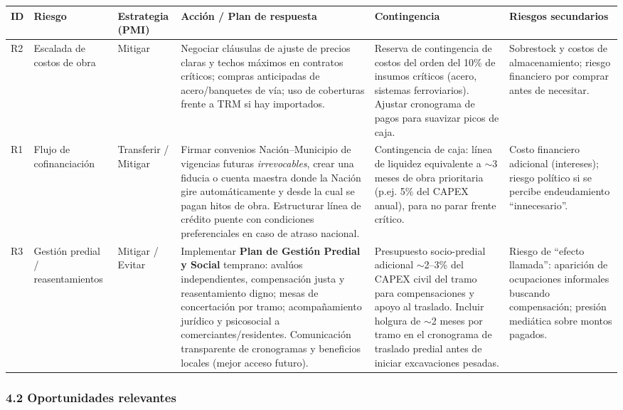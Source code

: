 \begin{table}[H]\centering\small
\begin{tabular}{p{1cm}p{2cm}p{1.5cm}p{3.5cm}p{3cm}p{3.5cm}}
\toprule
\textbf{ID} & \textbf{Riesgo} & \textbf{Estrategia (PMI)} & \textbf{Acción / Plan de respuesta} & \textbf{Contingencia} & \textbf{Riesgos secundarios} \\
\midrule
R2 & Escalada de costos de obra & Mitigar & 
Negociar cláusulas de ajuste de precios claras y techos máximos en contratos críticos; compras anticipadas de acero/banquetes de vía; uso de coberturas frente a TRM si hay importados. 
&
Reserva de contingencia de costos del orden del 10\% de insumos críticos (acero, sistemas ferroviarios). Ajustar cronograma de pagos para suavizar picos de caja. 
&
Sobrestock y costos de almacenamiento; riesgo financiero por comprar antes de necesitar. \\
\midrule
R1 & Flujo de cofinanciación & Transferir / Mitigar & 
Firmar convenios Nación--Municipio de vigencias futuras \emph{irrevocables}, crear una fiducia o cuenta maestra donde la Nación gire automáticamente y desde la cual se pagan hitos de obra. Estructurar línea de crédito puente con condiciones preferenciales en caso de atraso nacional.
&
Contingencia de caja: línea de liquidez equivalente a $\sim$3 meses de obra prioritaria (p.ej. 5\% del CAPEX anual), para no parar frente crítico. 
&
Costo financiero adicional (intereses); riesgo político si se percibe endeudamiento “innecesario”. \\
\midrule
R3 & Gestión predial / reasentamientos & Mitigar / Evitar & 
Implementar \textbf{Plan de Gestión Predial y Social} temprano: avalúos independientes, compensación justa y reasentamiento digno; mesas de concertación por tramo; acompañamiento jurídico y psicosocial a comerciantes/residentes. Comunicación transparente de cronogramas y beneficios locales (mejor acceso futuro). 
&
Presupuesto socio-predial adicional $\sim$2--3\% del CAPEX civil del tramo para compensaciones y apoyo al traslado. Incluir holgura de $\sim$2 meses por tramo en el cronograma de traslado predial antes de iniciar excavaciones pesadas. 
&
Riesgo de “efecto llamada”: aparición de ocupaciones informales buscando compensación; presión mediática sobre montos pagados. \\
\bottomrule
\end{tabular}
\end{table}

\subsubsection*{4.2 Oportunidades relevantes}

